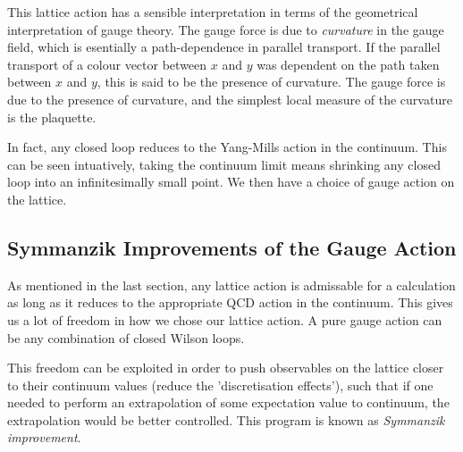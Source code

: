 This lattice action has a sensible interpretation in terms of the geometrical interpretation of gauge theory. The gauge force is due to {\it{curvature}} in the gauge field, which is esentially a path-dependence in parallel transport. If the parallel transport of a colour vector between $x$ and $y$ was dependent on the path taken between $x$ and $y$, this is said to be the presence of curvature. The gauge force is due to the presence of curvature, and the simplest local measure of the curvature is the plaquette.

In fact, any closed loop reduces to the Yang-Mills action in the continuum. This can be seen intuatively, taking the continuum limit means shrinking any closed loop into an infinitesimally small point. We then have a choice of gauge action on the lattice.

\subsection{Symmanzik Improvements of the Gauge Action}

As mentioned in the last section, any lattice action is admissable for a calculation as long as it reduces to the appropriate QCD action in the continuum. This gives us a lot of freedom in how we chose our lattice action. A pure gauge action can be any combination of closed Wilson loops.

This freedom can be exploited in order to push observables on the lattice closer to their continuum values (reduce the 'discretisation effects'), such that if one needed to perform an extrapolation of some expectation value to continuum, the extrapolation would be better controlled. This program is known as {\it{Symmanzik improvement}}.

